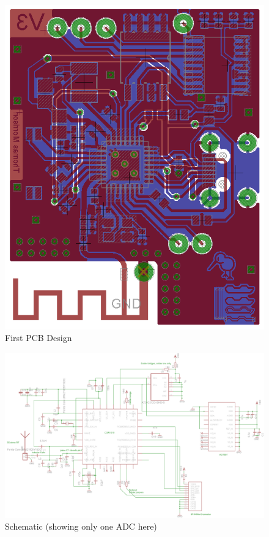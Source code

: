 \documentclass[]{article}
\begin{document}
\begin{figure}[H]
	\begin{center}
		\includegraphics[width = \textwidth]{boardv1}
	\end{center}
	\caption{First PCB Design}
	\label{fig:boardv1}
\end{figure}

\begin{figure}[H]
	\begin{center}
		\includegraphics[width = 1.6\textwidth, angle = 90]{Schematic}
	\end{center}
	\caption{Schematic (showing only one ADC here)}
	\label{fig:schematic}
\end{figure}
\end{document}
